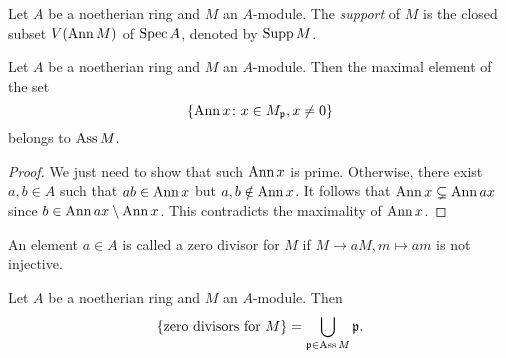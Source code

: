         \begin{definition}\label{def: support of a module}
            Let $A$ be a noetherian ring and $M$ an $A$-module.
            The \textit{support} of $M$ is the closed subset $V(\operatorname{Ann} M)$ of $\operatorname{Spec} A$, denoted by $\operatorname{Supp} M$.
        \end{definition}

        \begin{lemma}\label{lem: maximal Ann(x) is prime}
            Let $A$ be a noetherian ring and $M$ an $A$-module.
            Then the maximal element of the set 
            \[ \{ \operatorname{Ann} x \colon x \in M_{\mathfrak{p}}, x \neq 0 \} \]
            belongs to $\operatorname{Ass} M$.
        \end{lemma}
        \begin{proof}
            We just need to show that such $\operatorname{Ann} x$ is prime.
            Otherwise, there exist $a,b \in A$ such that $ab \in \operatorname{Ann} x$ but $a,b \notin \operatorname{Ann} x$.
            It follows that $\operatorname{Ann} x \subsetneq \operatorname{Ann} ax$ since $b \in \operatorname{Ann} ax \setminus \operatorname{Ann} x$.
            This contradicts the maximality of $\operatorname{Ann} x$.
        \end{proof}

        An element $a \in A$ is called a zero divisor for $M$ if $M \to aM, m\mapsto am$ is not injective.

        \begin{corollary}\label{cor: zero divisors and associated prime ideals}
            Let $A$ be a noetherian ring and $M$ an $A$-module.
            Then 
            \[ \{\text{zero divisors for } M \} = \bigcup_{{\mathfrak{p}} \in \operatorname{Ass} M} {\mathfrak{p}}. \]
        \end{corollary}

